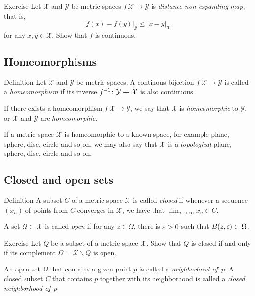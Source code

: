 \begin{thm}{Exercise}\label{ex:shrt=>continuous}
Let ${\mathcal X}$ and ${\mathcal Y}$ be metric spaces $f\:{\mathcal X}\to {\mathcal Y}$ is \emph{distance non-expanding map}; that is, 
\[|f(x)-f(y)|_{\mathcal Y}\le |x-y|_{\mathcal X}\]
for any $x,y\in \mathcal X$.
Show that $f$ is continuous.
\end{thm}

\subsection*{Homeomorphisms}

\begin{thm}{Definition}
Let ${\mathcal X}$ and ${\mathcal Y}$ be metric spaces.
A continous bijection $f\:{\mathcal X}\to {\mathcal Y}$ 
is called a \emph{homeomorphism} 
if its inverse $f^{-1}\:{\mathcal Y}\z\to {\mathcal X}$ is also continuous.

If there exists a homeomorphism $f\:{\mathcal X}\to {\mathcal Y}$,
we say that ${\mathcal X}$ is {}\emph{homeomorphic} to ${\mathcal Y}$,
or  $\mathcal X$ and ${\mathcal Y}$ are {}\emph{homeomorphic}.
\end{thm}

If a metric space $\mathcal X$ is homeomorphic to a known space, for example plane, sphere, disc, circle and so on,
we may also say that $\mathcal X$ is a \emph{topological} plane, sphere, disc, circle and so on.

\subsection*{Closed and open sets}

\begin{thm}{Definition}
A subset $C$ of a metric space $\mathcal{X}$ is called \emph{closed} if whenever a sequence $(x_n)$ of points from $C$ converges in $\mathcal{X}$, we have that $\lim_{n\to\infty} x_n \in C$.

A set $\Omega \subset \mathcal{X}$ is called \emph{open} if for any $z\in \Omega$, 
there is $\varepsilon>0$ such that $B(z,\varepsilon)\subset\Omega$.
\end{thm}

\begin{thm}{Exercise}\label{ex:close-open}
Let $Q$ be a subset of a metric space $\mathcal{X}$.
Show that $Q$ is closed if and only if its complement $\Omega=\mathcal{X}\backslash Q$ is open.
\end{thm}

An open set $\Omega$ that contains a given point $p$ is called a \emph{neighborhood of~$p$}.
A closed subset $C$ that contains $p$ together with its neighborhood is called a {}\emph{closed neighborhood of~$p$}
